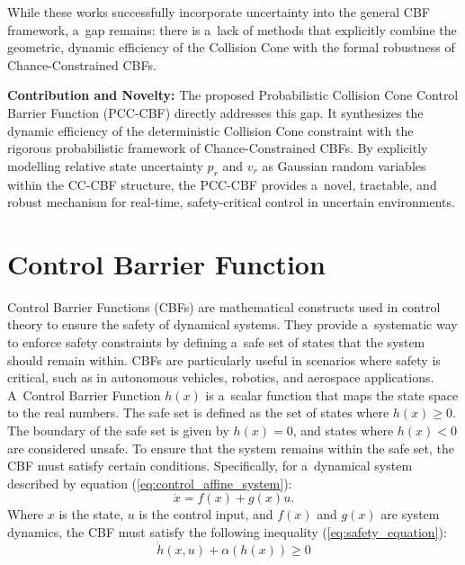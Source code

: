 \documentclass{svproc}
\begin{document}
While these works successfully incorporate uncertainty into the general CBF
framework, a~gap remains: there is a~lack of methods that explicitly combine
the geometric, dynamic efficiency of the Collision Cone with the formal
robustness of Chance-Constrained CBFs.

\textbf{Contribution and Novelty:}
The proposed Probabilistic Collision Cone Control Barrier Function (PCC-CBF)
directly addresses this gap. It synthesizes the dynamic efficiency of the
deterministic Collision Cone constraint with the rigorous probabilistic
framework of Chance-Constrained CBFs. By explicitly modelling relative state
uncertainty $p_r$ and $v_r$ as Gaussian random variables within the CC-CBF
structure, the PCC-CBF provides a~novel, tractable, and robust mechanism for
real-time, safety-critical control in uncertain environments.


\section{Control Barrier Function}\label{sec:cbf}
Control Barrier Functions (CBFs) are mathematical constructs used in control
theory to ensure the safety of dynamical systems. They provide a~systematic way
to enforce safety constraints by defining a~safe set of states that the system
should remain within. CBFs are particularly useful in scenarios where safety is
critical, such as in autonomous vehicles, robotics, and aerospace applications.
A~Control Barrier Function $h(x)$ is a~scalar function that maps the state space
to the real numbers. The safe set is defined as the set of states where $h(x)
\geq 0$. The boundary of the safe set is given by $h(x) = 0$, and states where
$h(x) < 0$ are considered unsafe. To ensure that the system remains within the
safe set, the CBF must satisfy certain conditions. Specifically, for a~dynamical
system described by equation (\ref{eq:control_affine_system}):
\begin{equation}
    \label{eq:control_affine_system}
    \dot{x} = f(x) + g(x)u.
\end{equation}
Where $x$ is the state, $u$ is the control input, and $f(x)$ and $g(x)$ are
system dynamics, the CBF must satisfy the following inequality (\ref{eq:safety_equation}):
\begin{equation}
    \label{eq:safety_equation}
    \dot{h}(x,u) + \alpha(h(x)) \geq 0
\end{equation}
\end{document}
